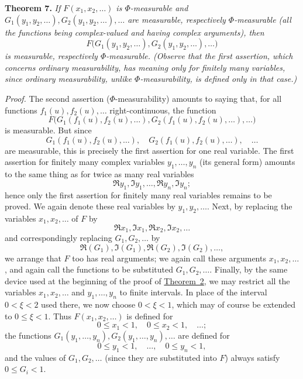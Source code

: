\documentclass[12pt,b5paper,twoside]{article}
\begin{document}
\medskip
{}\label{thm:7}
\noindent\textbf{Theorem 7.}
\textit{If $F(x_1,x_2,\ldots)$ is $\Phi$-measurable and
$G_1(y_1,y_2,\ldots),G_2(y_1,y_2,\ldots),\ldots$ are measurable, respectively
$\Phi$-measurable (all the functions being complex-valued and having complex
arguments), then}
\[
 F\bigl(G_1(y_1,y_2,\ldots),G_2(y_1,y_2,\ldots),\ldots\bigr)
\]
\textit{is measurable, respectively $\Phi$-measurable.  (Observe that the first
assertion, which concerns ordinary measurability, has meaning only for finitely many
variables, since ordinary measurability, unlike $\Phi$-measurability, is defined only
in that case.)}

\smallskip
\noindent\textit{Proof.}
The second assertion ($\Phi$-measurability) amounts to saying that, for all functions
$f_1(u),f_2(u),\ldots$ right-continuous, the function
\[
 F\bigl(G_1(f_1(u),f_2(u),\ldots),
         G_2(f_1(u),f_2(u),\ldots),\ldots\bigr)
\]
is measurable.  But since
\[
 G_1(f_1(u),f_2(u),\ldots),
 \quad G_2(f_1(u),f_2(u),\ldots),\quad\ldots
\]
are measurable, this is precisely the first assertion for one real variable.  The
first assertion for finitely many complex variables $y_1,\ldots,y_n$ (its general
form) amounts to the same thing as for twice as many real variables
\[
  \Re y_1,\Im y_1,\ldots,\Re y_n,\Im y_n;
\]
hence only the first assertion for finitely many real variables remains to be proved.
We again denote these real variables by $y_1,y_2,\ldots$.  Next, by replacing the
variables $x_1,x_2,\ldots$ of $F$ by
\[
  \Re x_1,\Im x_1,\Re x_2,\Im x_2,\ldots
\]
and correspondingly replacing
$G_1,G_2,\ldots$ by
\[
 \Re(G_1),\Im(G_1),\Re(G_2),\Im(G_2),\ldots,
\]
we arrange that $F$ too has real arguments; we again call these arguments
$x_1,x_2,\ldots$, and again call the functions to be substituted
$G_1,G_2,\ldots$.  Finally, by the same device used at the beginning of the proof of
\hyperref[thm:2]{Theorem~2}, we may restrict all the variables $x_1,x_2,\ldots$ and
$y_1,\ldots,y_n$ to finite intervals.  In place of the interval $0<\xi<2$ used there,
we now choose $0<\xi<1$, which may of course be extended to $0\leq\xi<1$.  Thus
$F(x_1,x_2,\ldots)$ is defined for
\[
 0\leq x_1<1,\quad 0\leq x_2<1,\quad\ldots;
\]
the functions $G_1(y_1,\ldots,y_n),G_2(y_1,\ldots,y_n),\ldots$ are defined for
\[
 0\leq y_1<1,\quad\ldots,\quad 0\leq y_n<1,
\]
and the values of $G_1,G_2,\ldots$ (since they are substituted into $F$) always satisfy
$0\leq G_i<1$.
\end{document}
